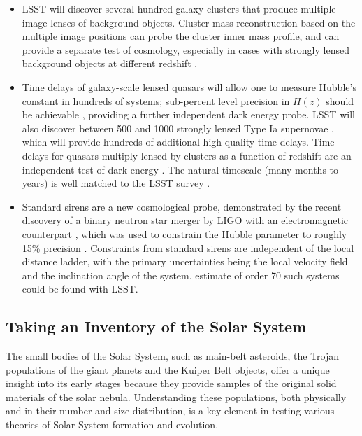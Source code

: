 \begin{itemize}
\item LSST will discover several hundred galaxy clusters that produce multiple-image lenses of background objects.
Cluster mass reconstruction based on the multiple image positions
 can probe the cluster inner mass profile, and can provide a separate test of cosmology, especially
in cases with strongly lensed background objects at different redshift \citep{2000ApJ...532..679P,2003MNRAS.338L..25O}.
\item Time delays of galaxy-scale lensed quasars will allow one to measure Hubble's constant
\citep[e.g.,][]{2010ApJ...711..201S,2017MNRAS.465.4914B} in hundreds of systems; sub-percent level precision in
$H(z)$ should be achievable \citep{2009ApJ...706...45C,2016A&ARv..24...11T}, providing a further independent dark energy probe.
LSST will also discover between 500 and 1000 strongly lensed Type Ia supernovae \citep{2017ApJ...834L...5G,2017arXiv170800003G}, which will provide hundreds of additional high-quality time delays.
Time delays for quasars multiply lensed by clusters as a function of redshift are an independent test
of dark energy \citep{1997ApJ...482...75K}. The natural timescale (many months to years) is well matched
to the LSST survey \citep{2010MNRAS.405.2579O}.
\item Standard sirens are a new cosmological probe, demonstrated by the recent discovery of a binary
  neutron star merger by LIGO with an electromagnetic counterpart \citep{2017ApJ...848L..12A}, which was
  used to constrain the Hubble parameter to roughly 15\% precision \citep{2017Natur.551...85A}.
  Constraints from standard sirens are independent of the local distance ladder, with the primary
  uncertainties being the local velocity field and the inclination angle of the system.  \citet{2018ApJ...852L...3S}
  estimate of order 70 such systems could be found with LSST.
\end{itemize}


\subsection{Taking an Inventory of the Solar System}



The small bodies of the Solar System, such as main-belt asteroids,
the Trojan populations of the giant planets and the Kuiper Belt objects,
offer a unique insight into its early stages because they provide
samples of the original solid materials of the solar nebula.
Understanding these populations, both physically and in their number
and size distribution, is a key element in testing various theories of
Solar System formation and evolution.

